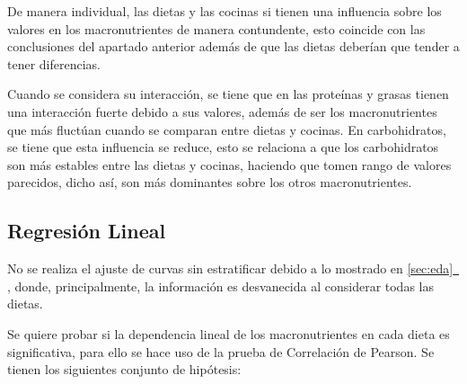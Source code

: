 \documentclass[12pt,a4paper]{article}
\newcommand{\fullref}[1]{%
  \hyperref[#1]{\cref*{#1}~\nameref*{#1}}%
}
\begin{document}
{{            De manera individual, las dietas y las cocinas si tienen una influencia 
            sobre los valores en los macronutrientes de manera contundente, esto 
            coincide con las conclusiones del apartado anterior además de que las dietas
            deberían que tender a tener diferencias.\newline
            
            Cuando se considera su interacción, 
            se tiene que en las proteínas y grasas tienen una interacción fuerte debido 
            a sus valores, además de ser los macronutrientes que más fluctúan cuando 
            se comparan entre dietas y cocinas. En carbohidratos, se tiene que esta 
            influencia se reduce, esto se relaciona a que los carbohidratos son más 
            estables entre las dietas y cocinas, haciendo que tomen rango de valores 
            parecidos, dicho así, son más dominantes sobre los otros macronutrientes.
        }

        \subsection{Regresión Lineal}
        {
            No se realiza el ajuste de curvas sin estratificar debido a lo mostrado 
            en \fullref{sec:eda}, donde, principalmente, la información es desvanecida 
            al considerar todas las dietas.\newline
        
            Se quiere probar si la dependencia lineal de los macronutrientes en cada 
            dieta es significativa, para ello se hace uso de la prueba de Correlación 
            de Pearson. Se tienen los siguientes conjunto de hipótesis:\\
            
}}
\end{document}
